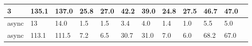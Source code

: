 \documentclass[12pt,a4paper]{report}
\begin{document}
\begin{table}[h]
\begin{tabular}{|l|l|l|l|l|l|l|l|l|l|l|l|}
		3                        & 135.1                              & 137.0                           & 25.8                        & 27.0                      & 42.2                           & 39.0   & 24.8 & 27.5   & 46.7 & 47.0   \\ \hline
		async                    & 13                                 & 14.0                            & 1.5                         & 1.5                       & 3.4                            & 4.0    & 1.4  & 1.0    & 5.5  & 5.0    \\ \hline
		async                    & 113.1                              & 111.5                           & 7.2                         & 6.5                       & 30.7                           & 31.0   & 7.0  & 6.0    & 68.2 & 67.0   \\ \hline
	\end{tabular}
\end{table}
\end{document}
